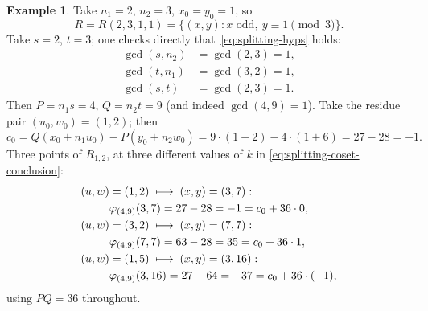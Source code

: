 \documentclass[a4paper,11pt,oneside,reqno]{amsart}
\theoremstyle{definition}
\newtheorem{example}[definition]{Example}
\theoremstyle{remark}
\theoremstyle{plain}
\begin{document}
\begin{example}
  \label{ex:splitting-worked}
  Take \(n_1=2\), \(n_2=3\), \(x_0=y_0=1\), so
  \[
    R=R(2,3,1,1)=\{(x,y):x\text{ odd},\ y\equiv1\!\!\pmod3\}.
  \]
  Take \(s=2\), \(t=3\); one checks directly that~\eqref{eq:splitting-hyps} holds:
  \begin{align}
    \gcd(s,n_2) &= \gcd(2,3) = 1, \\
    \gcd(t,n_1) &= \gcd(3,2) = 1, \\
    \gcd(s,t) &= \gcd(2,3) = 1.
  \end{align}
  Then \(P=n_1s=4\), \(Q=n_2t=9\) (and indeed \(\gcd(4,9)=1\)). Take the residue pair \((u_0,w_0)=(1,2)\);
  then
  \begin{equation}
    c_0 = Q(x_0+n_1u_0)-P(y_0+n_2w_0) = 9\cdot(1+2)-4\cdot(1+6) = 27-28 = -1.
  \end{equation}
  Three points of \(R_{1,2}\), at three different values of \(k\) in
  \eqref{eq:splitting-coset-conclusion}:
  \begin{align}
    (u,w)&=(1,2) \;\longmapsto\; (x,y)=(3,7): \notag\\
    &\varphi_{(4,9)}(3,7)=27-28=-1=c_0+36\cdot0, \\
    (u,w)&=(3,2) \;\longmapsto\; (x,y)=(7,7): \notag\\
    &\varphi_{(4,9)}(7,7)=63-28=35=c_0+36\cdot1, \\
    (u,w)&=(1,5) \;\longmapsto\; (x,y)=(3,16): \notag\\
    &\varphi_{(4,9)}(3,16)=27-64=-37=c_0+36\cdot(-1),
  \end{align}
  using \(PQ=36\) throughout.
\end{example}
\end{document}

